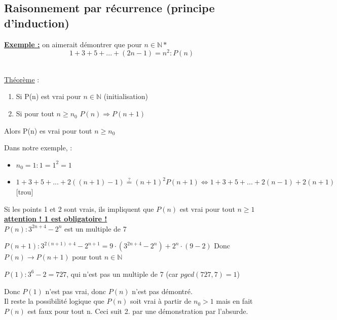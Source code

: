 \documentclass[12pt,a4paper]{article}
\newcommand{\evid}[1]{\textbf{\underline{#1}}}
\newcommand{\N}{\ensuremath{\mathbb{N}} }
\newcommand{\Theoreme}{\underline{Théorème} }
\begin{document}
\subsection{Raisonnement par récurrence (principe d'induction)}
{\setlength{\baselineskip}{3pt}
\evid{Exemple :} on aimerait démontrer que pour $n \in \N*$
\begin{equation}
1 + 3 + 5 +... + (2n-1) = n^2 : P(n)
\end{equation}\\
\begin{boite}
	\Theoreme:
	\begin{enumerate}
		\item Si P(n) est vrai pour $n \in \N$ (initialisation)	
		\item Si pour tout $n \geq n_0$ $P(n) \Rightarrow P(n+1)$
	\end{enumerate}
	Alors P(n) es vrai pour tout $n \geq n_0$
\end{boite}
\par}
Dans notre exemple, :
\begin{itemize}
	\item $n_0 = 1 : 1 = 1^2 = 1$
	\item $1+3+5+...+2((n+1)-1) \stackrel{?}{=} (n+1)^2 P(n+1) \iff 1+3+5+...+2(n-1) + 2(n+1) $[trou]
\end{itemize}
Si les points 1 et 2 sont vrais, ils impliquent que $P(n)$ est vrai pour tout $n \geq 1$\\
\evid{attention ! 1 est obligatoire !}\\
$P(n) : 3^{2n + 4} - 2^n$ est un multiple de 7
\begin{etaremune}
	\item $P(n+1) : 3^{2(n+1)+4}-2^{n+1} = 9\cdot (3^{2n+4}-2^n)+2^n\cdot(9-2)$ Donc $P(n) \to P(n+1)$ pour tout $n \in \N$
	\item $P(1) : 3^6-2 = 727$, qui n'est pas un multiple de 7 (car $pgcd(727,7 )= 1$)
\end{etaremune}
Donc $P(1)$ n'est pas vrai, donc $P(n)$ n'est pas démontré.\\
Il reste la possibilité logique que $P(n)$ soit vrai à partir de $n_0 > 1$ mais en fait $P(n)$ est faux pour tout n. Ceci suit 2. par une démonstration par l'absurde.
\end{document}
